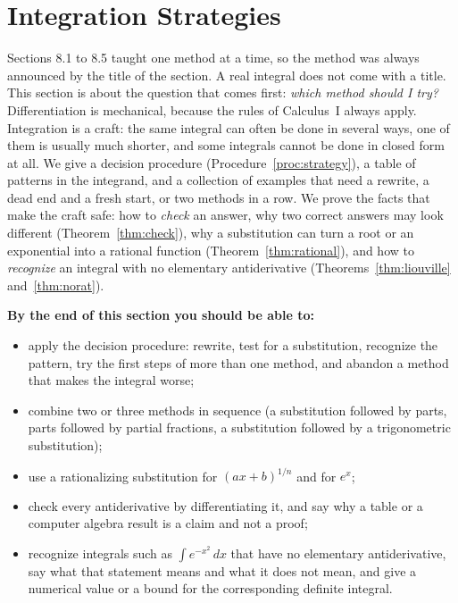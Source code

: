 \documentclass[11pt]{article}
\begin{document}
\section{Integration Strategies}

\begin{guide}
Sections 8.1 to 8.5 taught one method at a time, so the method was always announced by the title of the section. A real integral does not come with a title. This section is about the question that comes first: \emph{which method should I try?} Differentiation is mechanical, because the rules of Calculus~I always apply. Integration is a craft: the same integral can often be done in several ways, one of them is usually much shorter, and some integrals cannot be done in closed form at all. We give a decision procedure (Procedure~\ref{proc:strategy}), a table of patterns in the integrand, and a collection of examples that need a rewrite, a dead end and a fresh start, or two methods in a row. We prove the facts that make the craft safe: how to \emph{check} an answer, why two correct answers may look different (Theorem~\ref{thm:check}), why a substitution can turn a root or an exponential into a rational function (Theorem~\ref{thm:rational}), and how to \emph{recognize} an integral with no elementary antiderivative (Theorems~\ref{thm:liouville} and~\ref{thm:norat}).
\end{guide}

\textbf{By the end of this section you should be able to:}
\begin{itemize}
  \item apply the decision procedure: rewrite, test for a substitution, recognize the pattern, try the first steps of more than one method, and abandon a method that makes the integral worse;
  \item combine two or three methods in sequence (a substitution followed by parts, parts followed by partial fractions, a substitution followed by a trigonometric substitution);
  \item use a rationalizing substitution for $(ax+b)^{1/n}$ and for $e^x$;
  \item check every antiderivative by differentiating it, and say why a table or a computer algebra result is a claim and not a proof;
  \item recognize integrals such as $\int e^{-x^2}\,dx$ that have no elementary antiderivative, say what that statement means and what it does not mean, and give a numerical value or a bound for the corresponding definite integral.
\end{itemize}
\end{document}
